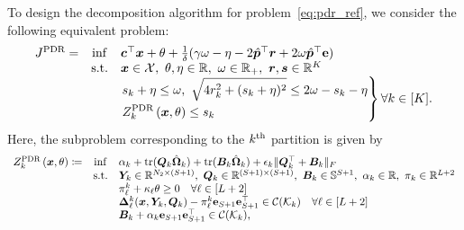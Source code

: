 \documentclass{article}
\newcommand{\st}{\textnormal{s.t.}}
\newcommand{\RR}{\mathbb{R}}
\newcommand{\X}{\mathcal{X}}
\newcommand{\tr}{\textup{tr}}
\begin{document}
To design the decomposition algorithm for  problem~\eqref{eq:pdr_ref}, we consider the following equivalent problem: %
\begin{equation}
\label{eq:pdr_ref2}
\begin{array}{ccll}
J^{\textup{PDR}} = &  \displaystyle \inf & \bm c^\top \bm x + \theta + \frac{1}{\delta} ( \gamma \omega - \eta - 2\hat{\bm p}^\top \bm r + 2\omega\hat{\bm p}^\top \mathbf{e}) \\
& \st & \bm x \in \X, \  \theta, \eta \in \RR,\ \omega \in \RR_{+},\ \bm r, \bm s \in \RR^{K} \\
& & \left.
\begin{aligned}
& s_k + \eta \leq \omega, \
\sqrt{4r_k^2 + (s_k +  \eta)^2} \leq 2\omega - s_k -\eta\\
& Z^{\textup{PDR}}_k \left(\bm x, \theta \right) \leq s_k \\
\end{aligned} \right \} \forall k \in [K].
\end{array}
\end{equation}
Here, the subproblem corresponding to the $k^{\textup{th}}$ partition  is given by
\begin{equation}
\label{eq:pdr_ref2_z}
\begin{array}{ccll}
Z^{\textup{PDR}}_k \left(\bm x, \theta \right) \coloneqq & \displaystyle \inf & \alpha_k + \tr(\bm Q_k\hat{\bm\Omega}_k) + \tr(\bm B_k\hat{\bm\Omega}_k) + \epsilon_k\|\bm Q_k^\top + \bm B_k\|_F  \\
& \st & \bm Y_k \in \RR^{N_2 \times (S+1)}, \ \bm Q_k \in \RR^{(S+1) \times (S+1)}, \ \bm B_k \in \mathbb{S}^{S+1},\ \alpha_k \in \RR, \ \pi_k \in \RR^{L+2} \\
& & \pi^k_\ell + \kappa_\ell \theta \geq 0 \quad \forall \ell \in [L+2] \\
& & \bm \Delta^k_\ell(\bm x,\bm Y_k,\bm Q_k) - \pi^k_\ell \mathbf{e}_{S+1} \mathbf{e}_{S+1}^\top 
\in \mathcal{C} (\mathcal K_k) \quad \forall \ell \in [L+2]  \\
& & \bm B_k + \alpha_k \mathbf{e}_{S+1} \mathbf{e}_{S+1}^\top \in \mathcal{C} (\mathcal K_k),
\end{array}
\end{equation}
\end{document}
